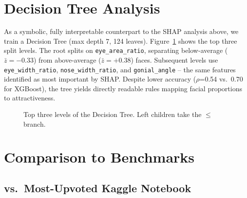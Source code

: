 \documentclass[a4paper,oneside,bibliography=totoc]{scrbook}
\begin{document}
\section{Decision Tree Analysis}

As a symbolic, fully interpretable counterpart to the SHAP analysis above, we train a Decision Tree (max depth 7, 124 leaves). Figure~\ref{fig:dtree} shows the top three split levels. The root splits on \texttt{eye\_area\_ratio}, separating below-average ($\bar{z}=-0.33$) from above-average ($\bar{z}=+0.38$) faces. Subsequent levels use \texttt{eye\_width\_ratio}, \texttt{nose\_width\_ratio}, and \texttt{gonial\_angle} -- the same features identified as most important by SHAP. Despite lower accuracy ($\rho$=0.54 vs.\ 0.70 for XGBoost), the tree yields directly readable rules mapping facial proportions to attractiveness.

\begin{figure}[h]
\centering
{}
\caption{Top three levels of the Decision Tree. Left children take the $\le$ branch.}
\label{fig:dtree}
\end{figure}

\section{Comparison to Benchmarks}

\subsection{vs.\ Most-Upvoted Kaggle Notebook}
\end{document}
